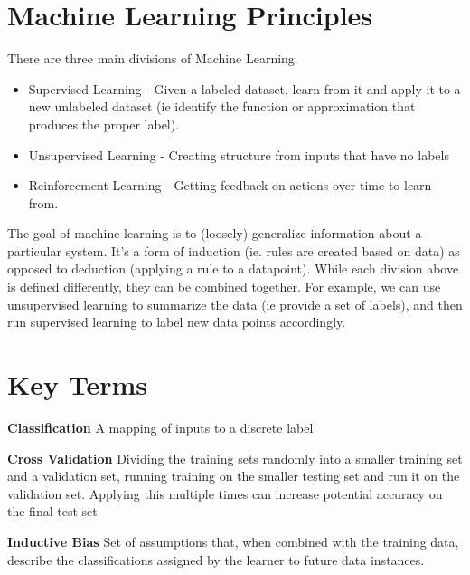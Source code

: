 \documentclass[11pt]{article}
\begin{document}
\tableofcontents

\clearpage

\section{Machine Learning Principles}

There are three main divisions of Machine Learning.

\begin{itemize}
\item Supervised Learning - Given a labeled dataset, learn from it and apply it to a new unlabeled dataset (ie identify the function or approximation that produces the proper label).
\item Unsupervised Learning - Creating structure from inputs that have no labels
\item Reinforcement Learning - Getting feedback on actions over time to learn from.
\end{itemize}

The goal of machine learning is to (loosely) generalize information about a particular system. It's a form of induction (ie. rules are created based on data) as opposed to deduction (applying a rule to a datapoint). While each division above is defined differently, they can be combined together. For example, we can use unsupervised learning to summarize the data (ie provide a set of labels), and then run supervised learning to label new data points accordingly.

\section{Key Terms}

\par\noindent\hangindent=1cm \textbf{Classification} A mapping of inputs to a discrete label\\

\par\noindent\hangindent=1cm \textbf{Cross Validation} Dividing the training sets randomly into a smaller training set and a validation set, running training on the smaller testing set and run it on the validation set. Applying this multiple times can increase potential accuracy on the final test set\\

\par\noindent\hangindent=1cm \textbf{Inductive Bias} Set of assumptions that, when combined with the training data, describe the classifications assigned by the learner to future data instances.\\
\end{document}
